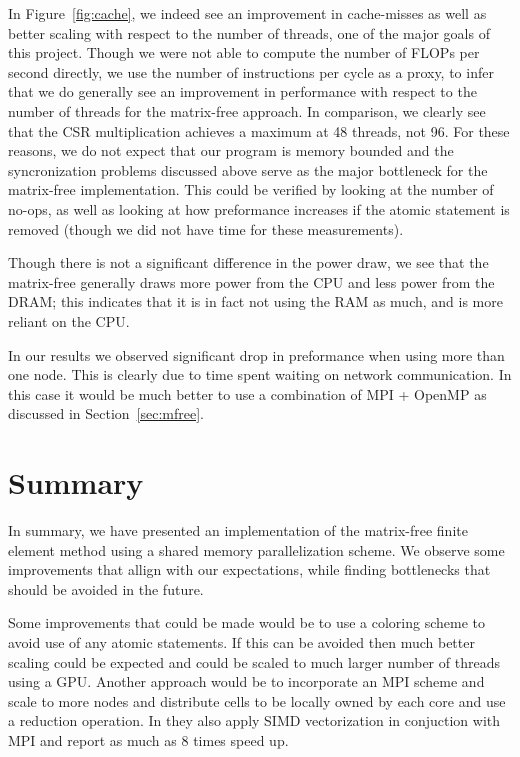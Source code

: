 \documentclass[12pt]{article}
\begin{document}
In Figure~\ref{fig:cache}, we indeed see an improvement in cache-misses as well as better scaling with respect to the number of threads, one of the major goals of this project. Though we were not able to compute the number of FLOPs per second directly, we use the number of instructions per cycle as a proxy, to infer that we do generally see an improvement in performance with respect to the number of threads for the matrix-free approach. In comparison, we clearly see that the CSR multiplication achieves a maximum at 48 threads, not 96. For these reasons, we do not expect that our program is memory bounded and the syncronization problems discussed above serve as the major bottleneck for the matrix-free implementation. This could be verified by looking at the number of no-ops, as well as looking at how preformance increases if the atomic statement is removed (though we did not have time for these measurements).

Though there is not a significant difference in the power draw, we see that the matrix-free generally draws more power from the CPU and less power from the DRAM; this indicates that it is in fact not using the RAM as much, and is more reliant on the CPU. 

In our results we observed significant drop in preformance when using more than one node. This is clearly due to time spent waiting on network communication. In this case it would be much better to use a combination of MPI + OpenMP as discussed in Section~\ref{sec:mfree}. 

\section{Summary}
In summary, we have presented an implementation of the matrix-free finite element method using a shared memory parallelization scheme. We observe some improvements that allign with our expectations, while finding bottlenecks that should be avoided in the future.

Some improvements that could be made would be to use a coloring scheme to avoid use of any atomic statements. If this can be avoided then much better scaling could be expected and could be scaled to much larger number of threads using a GPU. Another approach would be to incorporate an MPI scheme and scale to more nodes and distribute cells to be locally owned by each core and use a reduction operation. In \cite{step37} they also apply SIMD vectorization in conjuction with MPI and report as much as 8 times speed up. 
\end{document}
